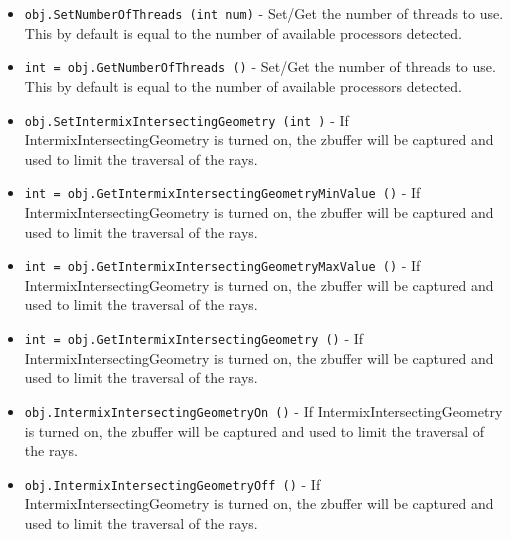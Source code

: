 \begin{itemize}
\item  \verb|obj.SetNumberOfThreads (int num)| -  Set/Get the number of threads to use. This by default is equal to
 the number of available processors detected.

\item  \verb|int = obj.GetNumberOfThreads ()| -  Set/Get the number of threads to use. This by default is equal to
 the number of available processors detected.

\item  \verb|obj.SetIntermixIntersectingGeometry (int )| -  If IntermixIntersectingGeometry is turned on, the zbuffer will be
 captured and used to limit the traversal of the rays.

\item  \verb|int = obj.GetIntermixIntersectingGeometryMinValue ()| -  If IntermixIntersectingGeometry is turned on, the zbuffer will be
 captured and used to limit the traversal of the rays.

\item  \verb|int = obj.GetIntermixIntersectingGeometryMaxValue ()| -  If IntermixIntersectingGeometry is turned on, the zbuffer will be
 captured and used to limit the traversal of the rays.

\item  \verb|int = obj.GetIntermixIntersectingGeometry ()| -  If IntermixIntersectingGeometry is turned on, the zbuffer will be
 captured and used to limit the traversal of the rays.

\item  \verb|obj.IntermixIntersectingGeometryOn ()| -  If IntermixIntersectingGeometry is turned on, the zbuffer will be
 captured and used to limit the traversal of the rays.

\item  \verb|obj.IntermixIntersectingGeometryOff ()| -  If IntermixIntersectingGeometry is turned on, the zbuffer will be
 captured and used to limit the traversal of the rays.

\end{itemize}
